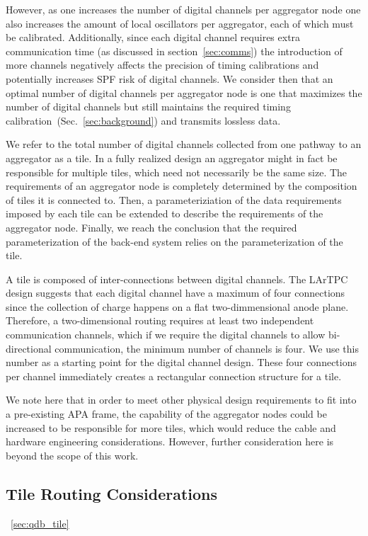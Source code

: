 However, as one increases the number of digital channels per aggregator node one also increases the amount of local oscillators per aggregator, each of which must be calibrated.
Additionally, since each digital channel requires extra communication time (as discussed in section~\ref{sec:comms}) the introduction of more channels negatively affects the precision of timing calibrations and potentially increases SPF risk of digital channels.
We consider then that an optimal number of digital channels per aggregator node is one that maximizes the number of digital channels but still maintains the required timing calibration~(Sec.~\ref{sec:background}) and transmits lossless data.

We refer to the total number of digital channels collected from one pathway to an aggregator as a tile.
In a fully realized design an aggregator might in fact be responsible for multiple tiles, which need not necessarily be the same size.
The requirements of an aggregator node is completely determined by the composition of tiles it is connected to.
Then, a parameteriziation of the data requirements imposed by each tile can be extended to describe the requirements of the aggregator node.
Finally, we reach the conclusion that the required parameterization of the back-end system relies on the parameterization of the tile.

A tile is composed of inter-connections between digital channels.
The LArTPC design suggests that each digital channel have a maximum of four connections since the collection of charge happens on a flat two-dimmensional anode plane.
Therefore, a two-dimensional routing requires at least two independent communication channels, which if we require the digital channels to allow bi-directional communication, the minimum number of channels is four.
We use this number as a starting point for the digital channel design.
These four connections per channel immediately creates a rectangular connection structure for a tile.

We note here that in order to meet other physical design requirements to fit into a pre-existing APA frame, the capability of the aggregator nodes could be increased to be responsible for more tiles, which would reduce the cable and hardware engineering considerations.
However, further consideration here is beyond the scope of this work.

\subsection{Tile Routing Considerations}~\ref{sec:qdb_tile}


